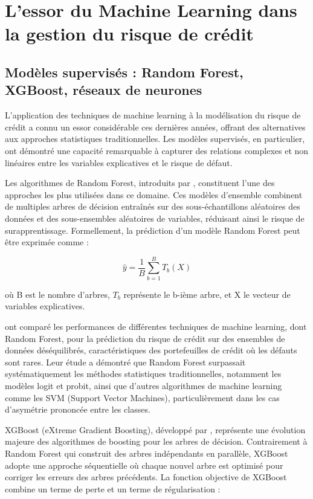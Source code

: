 \section{L'essor du Machine Learning dans la gestion du risque de crédit}

\subsection{Modèles supervisés : Random Forest, XGBoost, réseaux de neurones}

L'application des techniques de machine learning à la modélisation du risque de crédit a connu un essor considérable ces dernières années, offrant des alternatives aux approches statistiques traditionnelles. Les modèles supervisés, en particulier, ont démontré une capacité remarquable à capturer des relations complexes et non linéaires entre les variables explicatives et le risque de défaut.

Les algorithmes de Random Forest, introduits par \citet{breiman2001}, constituent l'une des approches les plus utilisées dans ce domaine. Ces modèles d'ensemble combinent de multiples arbres de décision entraînés sur des sous-échantillons aléatoires des données et des sous-ensembles aléatoires de variables, réduisant ainsi le risque de surapprentissage. Formellement, la prédiction d'un modèle Random Forest peut être exprimée comme :

\begin{equation}
\hat{y} = \frac{1}{B} \sum_{b=1}^{B} T_b(X)
\end{equation}

où B est le nombre d'arbres, $T_b$ représente le b-ième arbre, et X le vecteur de variables explicatives.

\citet{brown2012} ont comparé les performances de différentes techniques de machine learning, dont Random Forest, pour la prédiction du risque de crédit sur des ensembles de données déséquilibrés, caractéristiques des portefeuilles de crédit où les défauts sont rares. Leur étude a démontré que Random Forest surpassait systématiquement les méthodes statistiques traditionnelles, notamment les modèles logit et probit, ainsi que d'autres algorithmes de machine learning comme les SVM (Support Vector Machines), particulièrement dans les cas d'asymétrie prononcée entre les classes.

XGBoost (eXtreme Gradient Boosting), développé par \citet{chen2016}, représente une évolution majeure des algorithmes de boosting pour les arbres de décision. Contrairement à Random Forest qui construit des arbres indépendants en parallèle, XGBoost adopte une approche séquentielle où chaque nouvel arbre est optimisé pour corriger les erreurs des arbres précédents. La fonction objective de XGBoost combine un terme de perte et un terme de régularisation :

